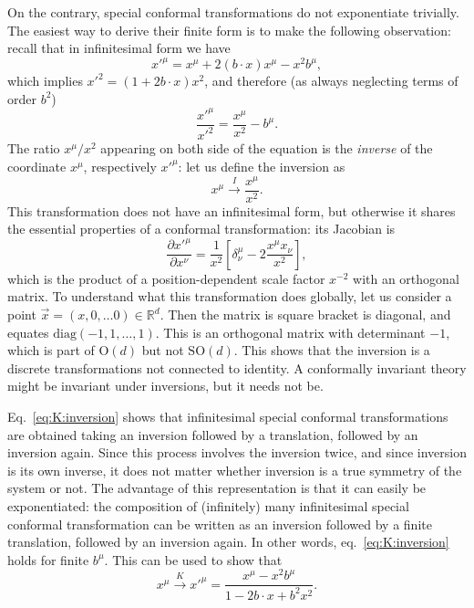 \documentclass[a4paper,12pt]{article}
\numberwithin{equation}{section}
\begin{document}
On the contrary, special conformal transformations do not exponentiate trivially. The easiest way to derive their finite form is to make the following observation: recall that in infinitesimal form we have
\begin{equation}
	x'^\mu = x^\mu + 2 (b \cdot x) x^\mu - x^2 b^\mu,
\end{equation}
which implies $x'^2 = \left( 1 + 2 b \cdot x \right) x^2$, and therefore (as always neglecting terms of order $b^2$)
\begin{equation}
	\frac{x'^\mu}{x'^2}
	= \frac{x^\mu}{x^2} - b^\mu.
	\label{eq:K:inversion}
\end{equation}
The ratio $x^\mu/x^2$ appearing on both side of the equation is the \emph{inverse} of the coordinate $x^\mu$, respectively $x'^\mu$: let us define the inversion as
\begin{equation}
	x^\mu \xrightarrow{I} \frac{x^\mu}{x^2}.
\end{equation}
This transformation does not have an infinitesimal form, but otherwise it shares the essential properties of a conformal transformation: its Jacobian is
\begin{equation}
	\frac{\partial x'^\mu}{\partial x^\nu}
	= \frac{1}{x^2}
	\left[ \delta^\mu_\nu - 2 \frac{x^\mu x_\nu}{x^2} \right],
\end{equation}
which is the product of a position-dependent scale factor $x^{-2}$ with an orthogonal matrix. To understand what this transformation does globally, let us consider a point $\vec{x} = (x, 0, \ldots 0) \in \mathds{R}^d$. Then the matrix is square bracket is diagonal, and equates $\text{diag}(-1, 1, \ldots, 1)$. This is an orthogonal matrix with determinant $-1$, which is part of $\text{O}(d)$ but not $\text{SO}(d)$. This shows that the inversion is a discrete transformations not connected to identity.
A conformally invariant theory might be invariant under inversions, but it needs not be.

Eq.~\eqref{eq:K:inversion} shows that infinitesimal special conformal transformations are obtained taking an inversion followed by a translation, followed by an inversion again. Since this process involves the inversion twice, and since inversion is its own inverse, it does not matter whether inversion is a true symmetry of the system or not.
The advantage of this representation is that it can easily be exponentiated: the composition of (infinitely) many infinitesimal special conformal transformation can be written as an inversion followed by a finite translation, followed by an inversion again. In other words, eq.~\eqref{eq:K:inversion} holds for finite $b^\mu$.
This can be used to show that
\begin{equation}
	x^\mu \xrightarrow{K}
	x'^\mu = \frac{x^\mu - x^2 b^\mu}
	{1 - 2 b \cdot x + b^2 x^2}.
	\label{eq:K:finite}
\end{equation}
\end{document}
